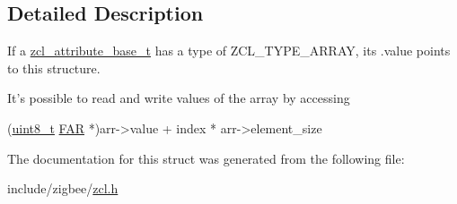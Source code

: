 \subsection{Detailed Description}
If a \hyperlink{structzcl__attribute__base__t}{zcl\-\_\-attribute\-\_\-base\-\_\-t} has a type of Z\-C\-L\-\_\-\-T\-Y\-P\-E\-\_\-\-A\-R\-R\-A\-Y, its .value points to this structure. 

It's possible to read and write values of the array by accessing 
\begin{DoxyCode}
(\hyperlink{group__hal_gae1affc9ca37cfb624959c866a73f83c2}{uint8\_t} \hyperlink{group__hal_gaef060b3456fdcc093a7210a762d5f2ed}{FAR} *)arr->value + index * arr->element\_size 
\end{DoxyCode}
 

The documentation for this struct was generated from the following file\-:\begin{DoxyCompactItemize}
\item 
include/zigbee/\hyperlink{zcl_8h}{zcl.\-h}\end{DoxyCompactItemize}

